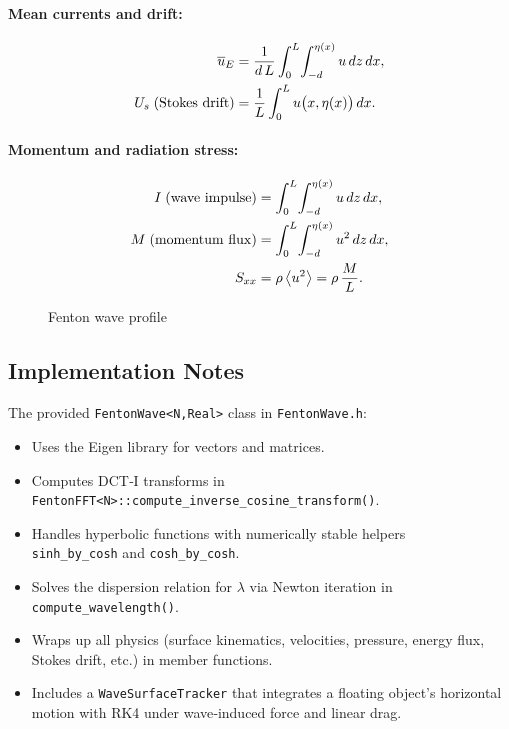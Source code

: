 \documentclass[11pt,letterpaper]{article}
\begin{document}
\paragraph{Mean currents and drift:}
\begin{align}
\overline{u}_{E} 
&= \frac{1}{d\,L}\int_{0}^{L}\!\int_{-d}^{\eta(x)} u\,dz\,dx, 
\\
U_{s}\;({\rm Stokes\ drift})
&= \frac{1}{L}\int_{0}^{L} u\bigl(x,\eta(x)\bigr)\,dx.
\end{align}

\paragraph{Momentum and radiation stress:}
\begin{align}
I\;({\rm wave\ impulse})
&= \int_{0}^{L}\!\int_{-d}^{\eta(x)} u\,dz\,dx, 
\\
M\;({\rm momentum\ flux})
&= \int_{0}^{L}\!\int_{-d}^{\eta(x)} u^{2}\,dz\,dx, 
\\
S_{xx}
&= \rho\,\bigl\langle u^{2}\bigr\rangle
   = \rho\,\frac{M}{L}.
\end{align}

\begin{figure}[H]
    \centering
    \resizebox{\textwidth}{!}{}
    \caption{Fenton wave profile}
    \label{fig:waveProfile}
\end{figure}

\subsection{Implementation Notes}

The provided \verb|FentonWave<N,Real>| class in \texttt{FentonWave.h}:
\begin{itemize}
  \item Uses the Eigen library for vectors and matrices.
  \item Computes DCT‐I transforms in \\ \verb|FentonFFT<N>::compute_inverse_cosine_transform()|.
  \item Handles hyperbolic functions with numerically stable helpers\\
  \verb|sinh_by_cosh| and \verb|cosh_by_cosh|.
  \item Solves the dispersion relation for $\lambda$ via Newton iteration in \\ \verb|compute_wavelength()|.
  \item Wraps up all physics (surface kinematics, velocities, pressure, energy flux, Stokes drift, etc.) in member functions.
  \item Includes a \verb|WaveSurfaceTracker| that integrates a floating object’s horizontal motion with RK4 under wave‐induced force and linear drag.
\end{itemize}
\end{document}
